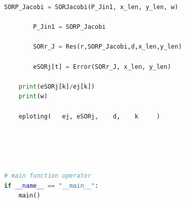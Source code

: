 \documentclass[12pt]{article}
\begin{document}
\begin{scriptsize}
\begin{lstlisting}[language=python,caption={(3)-The python Source code}]
        SORP_Jacobi = SORJacobi(P_Jin1, x_len, y_len, w)

        P_Jin1 = SORP_Jacobi

        SORr_J = Res(r,SORP_Jacobi,d,x_len,y_len)

        eSORj[t] = Error(SORr_J, x_len, y_len)

    print(eSORj[k]/ej[k])
    print(w)
    
    eploting(   ej, eSORj,    d,    k     )





# main function operator
if __name__ == "__main__":
    main()








    


\end{lstlisting}
\end{scriptsize}

\end{document}

